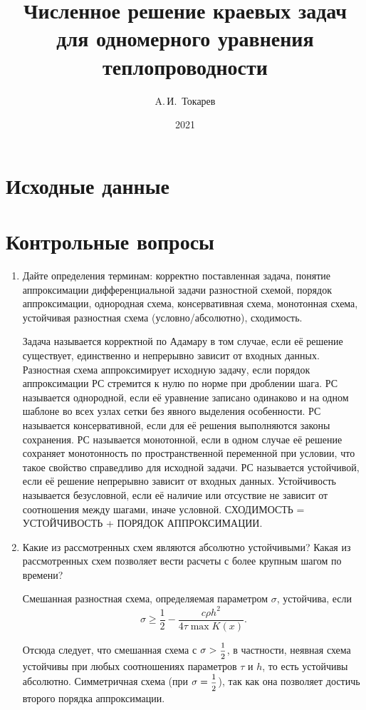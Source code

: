 \documentclass[12pt, a4paper]{article}
\title{Численное решение краевых задач для одномерного уравнения теплопроводности}
\author{A.\,И.~Токарев}
\date{2021}
\begin{document}
\maketitle
\tableofcontents 
\newpage

\section{Исходные данные}



\newpage
\section{Контрольные вопросы}
\begin{enumerate}
\item Дайте определения терминам: корректно поставленная задача, понятие аппроксимации дифференциальной задачи разностной схемой, порядок аппроксимации, однородная схема, консервативная схема, монотонная схема, устойчивая разностная схема (условно/абсолютно), сходимость.

Задача называется корректной по Адамару в том случае, если её решение существует, единственно и непрерывно зависит от входных данных. Разностная схема аппроксимирует исходную задачу, если порядок аппроксимации РС стремится к нулю по норме при дроблении шага. РС называется однородной, если её уравнение записано одинаково и на одном шаблоне во всех узлах сетки без явного выделения особенности. РС называется консервативной, если для её решения выполняются законы сохранения. РС называется монотонной, если в одном случае её решение сохраняет монотонность по пространственной переменной при условии, что такое свойство справедливо для исходной задачи. РС называется устойчивой, если её решение непрерывно зависит от входных данных. Устойчивость называется безусловной, если её наличие или отсуствие не зависит от соотношения между шагами, иначе условной. СХОДИМОСТЬ = УСТОЙЧИВОСТЬ + ПОРЯДОК АППРОКСИМАЦИИ.

\item Какие из рассмотренных схем являются абсолютно устойчивыми? Какая из рассмотренных схем позволяет вести расчеты с более крупным шагом по времени?

Смешанная разностная схема, определяемая параметром $\sigma$, устойчива, если
\[
\sigma \geq \dfrac{1}{2} - \dfrac{c \rho h^2}{4 \tau \max K(x)}.
\]

Отсюда следует, что смешанная схема с $\sigma > \hbox{\footnotesize$\displaystyle\frac{1}{2}$}$, в частности,
неявная схема устойчивы при любых соотношениях параметров $\tau$ и $h$, то есть устойчивы абсолютно. Симметричная схема (при $\sigma = \hbox{\footnotesize$\displaystyle\frac{1}{2}$}$), так как она позволяет достичь второго порядка аппроксимации. 


\end{enumerate}
\end{document}
